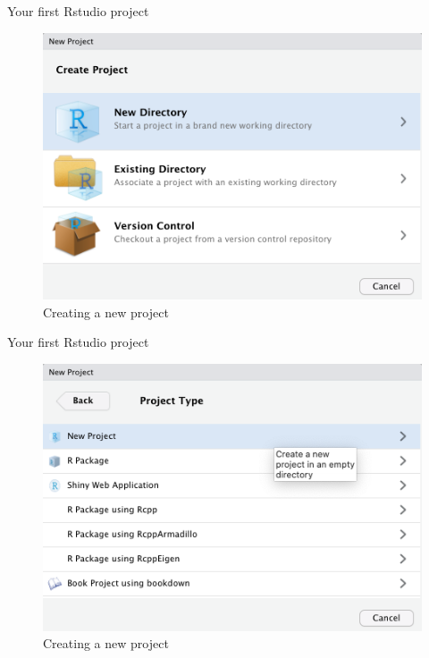 \documentclass[ignorenonframetext,]{beamer}
\begin{document}
\begin{frame}{Your first Rstudio project}
\protect\hypertarget{your-first-rstudio-project-1}{}

\begin{figure}
\includegraphics[scale=0.47]{figures/new-project-2}
\caption{Creating a new project}
\end{figure}

\end{frame}

\begin{frame}{Your first Rstudio project}
\protect\hypertarget{your-first-rstudio-project-2}{}

\begin{figure}
\includegraphics[scale=0.47]{figures/new-project-3}
\caption{Creating a new project}
\end{figure}

\end{frame}
\end{document}
